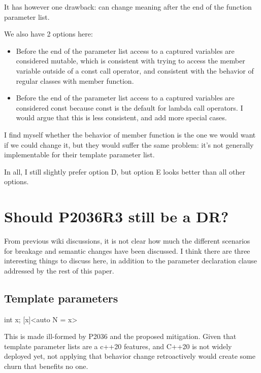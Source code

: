 \documentclass{wg21}
\begin{document}
It has however one drawback:  can change meaning after the end of the function parameter list.

We also have 2 options here:

\begin{itemize}
\item Before the end of the parameter list access to a captured variables are considered mutable, which is consistent with trying to
access the member variable outside of a const call operator, and consistent with the behavior of regular classes with member function.

\item Before the end of the parameter list access to a captured variables are considered const because const is the default for lambda call operators. I would argue that this is less consistent, and add more special cases. 
\end{itemize} 

I find myself whether the behavior of member function is the one we would want if we could change it,
but they would suffer the same problem: it's not generally implementable for their template parameter list.

In all, I still slightly prefer option D, but option E looks better than all other options.

\section{Should P2036R3 still be a DR?}

From previous wiki discussions, it is not clear how much the different scenarios for breakage and semantic changes have been discussed.
I think there are three interesting things to discuss here, in addition to the parameter declaration clause addressed by the rest of this paper.

\subsection{Template parameters}
\begin{colorblock}
int x;
[x]<auto N = x> {}
\end{colorblock}

This is made ill-formed by P2036 and the proposed mitigation. Given that template parameter lists are a c++20 features, and C++20 is not widely deployed yet, not applying that behavior
change retroactively would create some churn that benefits no one.
\end{document}

